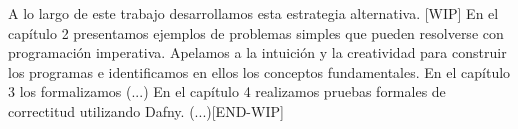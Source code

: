 \documentclass[12pt, a4paper, openany, fleqn]{book}
\begin{document}
    A lo largo de este trabajo desarrollamos esta estrategia alternativa.
    [WIP]
    En el capítulo 2 presentamos ejemplos de problemas simples que pueden resolverse con programación imperativa. Apelamos a la intuición y la creatividad para construir los programas e identificamos en ellos los conceptos fundamentales.
    En el capítulo 3 los formalizamos (...)
    En el capítulo 4 realizamos pruebas formales de correctitud utilizando Dafny. (...)[END-WIP]

    
    
\end{document}
